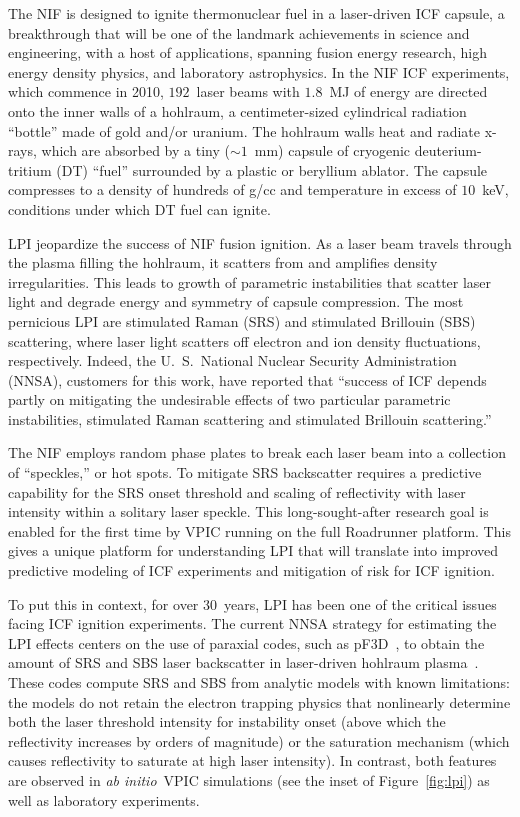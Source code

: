 \documentclass[journal,twoside]{IEEEtran}
\newcommand{\fig}[1]{Figure~\ref{fig:#1}}
\newcommand{\abinitio} {\textit{ab initio}}
\begin{document}
The NIF is designed to ignite thermonuclear fuel in a laser-driven ICF
capsule, a breakthrough that will be one of the landmark achievements
in science and engineering, with a host of applications, spanning
fusion energy research, high energy density physics, and laboratory
astrophysics.  In the NIF ICF experiments, which commence in 2010,
$192$~laser beams with $1.8$~MJ of energy are directed onto the inner
walls of a hohlraum, a centimeter-sized cylindrical radiation
``bottle'' made of gold and/or uranium.  The hohlraum walls heat and
radiate x-rays, which are absorbed by a tiny ($\sim 1$~mm) capsule of
cryogenic deuterium-tritium (DT) ``fuel'' surrounded by a plastic or
beryllium ablator.  The capsule compresses to a density of hundreds of
g/cc and temperature in excess of $10$~keV, conditions under which DT
fuel can ignite.

LPI jeopardize the success of NIF fusion ignition.  As a laser beam
travels through the plasma filling the hohlraum, it scatters from and
amplifies density irregularities.  This leads to growth of parametric
instabilities that scatter laser light and degrade energy and symmetry
of capsule compression.  The most pernicious LPI are stimulated Raman
(SRS) and stimulated Brillouin (SBS) scattering, where laser light
scatters off electron and ion density fluctuations, respectively.
Indeed, the U.~S.~National Nuclear Security Administration (NNSA),
customers for this work, have reported that ``success of ICF depends
partly on mitigating the undesirable effects of two particular
parametric instabilities, stimulated Raman scattering and stimulated
Brillouin scattering.''~\cite{LLNL_LPI_webpage}

The NIF employs random phase plates to break each laser beam into a
collection of ``speckles,'' or hot spots.  To mitigate SRS backscatter
requires a predictive capability for the SRS onset threshold and
scaling of reflectivity with laser intensity within a solitary laser
speckle.  This long-sought-after research goal is enabled for the
first time by VPIC running on the full Roadrunner platform.  This
gives a unique platform for understanding LPI that will translate into
improved predictive modeling of ICF experiments and mitigation of risk
for ICF ignition.

To put this in context, for over $30$~years, LPI has been one of the
critical issues facing ICF ignition experiments.  The current NNSA
strategy for estimating the LPI effects centers on the use of paraxial
codes, such as pF3D~\cite{Berger_Phys_Plasmas_1998}, to obtain the
amount of SRS and SBS laser backscatter in laser-driven hohlraum
plasma~\cite{Glenzer_Nature_Physics_2007,Labaune_Nature_Physics_2007}.
These codes compute SRS and SBS from analytic models with known
limitations: the models do not retain the electron trapping physics
that nonlinearly determine both the laser threshold intensity for
instability onset (above which the reflectivity increases by orders of
magnitude) or the saturation mechanism (which causes reflectivity to
saturate at high laser intensity).  In contrast, both features are
observed in \abinitio\ VPIC simulations (see the inset of
\fig{lpi}) as well as laboratory
experiments.~\cite{Montgomery_et_al_Phys_Plasmas_2002}
\end{document}

